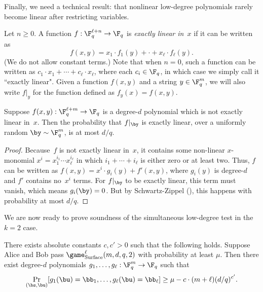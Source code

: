 Finally, we need a technical result: that nonlinear low-degree polynomials rarely become linear after restricting variables.

\begin{definition}
Let $n \geq 0$.
A function $f:\F_q^{\ell + n} \rightarrow \F_q$ is \emph{exactly linear in~$x$}
if it can be written as
\begin{equation*}
f(x, y) = x_1 \cdot f_1(y) + \cdot + x_\ell \cdot f_{\ell}(y).
\end{equation*}
(We do not allow constant terms.)
Note that when $n = 0$, such a function can be written as $c_1 \cdot x_1 + \cdots + c_\ell \cdot x_\ell$, where each $c_i \in \F_q$,
in which case we simply call it ``exactly linear".
Given a function $f(x, y)$ and a string $y \in \F_q^m$,
we will also write $f|_y$ for the function defined as $f_y(x) = f(x, y)$.
\end{definition}

\begin{proposition}\label{prop:exactly-linear-prop}
Suppose $f(x, y): \F_q^{\ell + m} \rightarrow \F_q$
is a degree-$d$ polynomial which is not exactly linear in~$x$.
Then the probability that $f|_{\by}$ is exactly linear, over a uniformly random $\by \sim \F_q^m$, is at most $d/q$.
\end{proposition}
\begin{proof}
Because~$f$ is not exactly linear in~$x$, it contains some non-linear $x$-monomial $x^i = x_1^{i_1} \cdots x_\ell^{i_\ell}$
in which $i_1 + \cdots + i_\ell$ is either zero or at least two.
Thus, $f$ can be written as
$f(x, y) = x^i \cdot g_i(y) + f'(x, y)$, where $g_i(y)$ is degree-$d$ and $f'$ contains no~$x^i$ terms.
For $f|_{\by}$ to be exactly linear, this term must vanish, which means $g_i(\by) = 0$.
But by Schwartz-Zippel (), this happens with probability at most $d/q$.
\end{proof}

We are now ready to prove soundness of the simultaneous low-degree test in the $k = 2$ case.

\begin{theorem}\label{thm:simultaneous-raz-safra}
There exists absolute constants $c, c' >0$ such that the following holds.
Suppose Alice and Bob pass $\game_{\mathrm{Surface}}^\ell(m, d, q,2)$ with probability at least $\mu$.
Then there exist degree-$d$ polynomials $g_1, \ldots, g_{\ell} : \F_q^m \rightarrow \F_q$ such that
\begin{equation*}
\Pr_{(\bs, \bu)} [g_1(\bu) = \bb_1, \ldots, g_{\ell}(\bu) = \bb_\ell] \geq \mu - c \cdot (m + \ell) (d/q)^{c'}.
\end{equation*}
\end{theorem}

